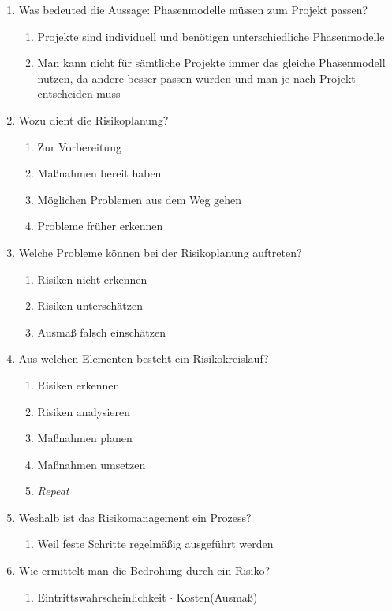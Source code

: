 \documentclass[12pt,a4paper]{article}
\begin{document}
\begin{enumerate}
	\item Was bedeuted die Aussage: Phasenmodelle müssen zum Projekt passen?
	\begin{enumerate}
		\item Projekte sind individuell und benötigen unterschiedliche Phasenmodelle
		\item Man kann nicht für sämtliche Projekte immer das gleiche Phasenmodell nutzen, da andere besser passen würden und man je nach Projekt entscheiden muss
	\end{enumerate}
	\item Wozu dient die Risikoplanung?
	\begin{enumerate}
		\item Zur Vorbereitung
		\item Maßnahmen bereit haben
		\item Möglichen Problemen aus dem Weg gehen
		\item Probleme früher erkennen
	\end{enumerate}
	\item Welche Probleme können bei der Risikoplanung auftreten?
	\begin{enumerate}
		\item Risiken nicht erkennen
		\item Risiken unterschätzen
		\item Ausmaß falsch einschätzen
	\end{enumerate}
	\item Aus welchen Elementen besteht ein Risikokreislauf?
	\begin{enumerate}
		\item Risiken erkennen
		\item Risiken analysieren
		\item Maßnahmen planen 
		\item Maßnahmen umsetzen
		\item \textit{Repeat}
	\end{enumerate}
	\item Weshalb ist das Risikomanagement ein Prozess?
	\begin{enumerate}
		\item Weil feste Schritte regelmäßig ausgeführt werden
	\end{enumerate}
	\item Wie ermittelt man die Bedrohung durch ein Risiko?
	\begin{enumerate}
		\item Eintrittswahrscheinlichkeit $\cdot$ Kosten(Ausmaß)
	\end{enumerate}

\end{enumerate}
\end{document}
